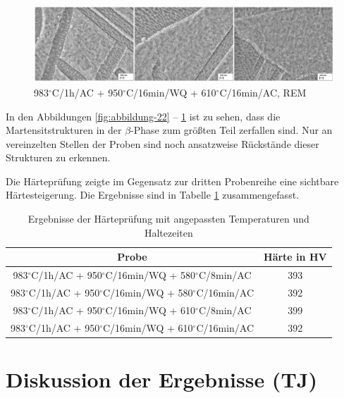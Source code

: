 \begin{figure}
	\centering
	\includegraphics[width=1.0\linewidth]{./Bilder/Abbildung 25.png}
	\caption[Abbildung 25]{983$^\circ$C/1h/AC + 950$^\circ$C/16min/WQ + 610$^\circ$C/16min/AC, REM}
	\label{fig:abbildung-25}
\end{figure}

In den Abbildungen \ref{fig:abbildung-22} -- \ref{fig:abbildung-25} ist zu sehen, dass die Martensitstrukturen in der $\beta$-Phase zum größten Teil zerfallen sind. Nur an vereinzelten Stellen der Proben sind noch ansatzweise Rückstände dieser Strukturen zu erkennen.

Die Härteprüfung zeigte im Gegensatz zur dritten Probenreihe eine sichtbare Härtesteigerung. Die Ergebnisse sind in Tabelle \ref{Tabelle 8} zusammengefasst.

\begin{table}
	\centering
	\begin{tabular}{|c|c|}
		\hline 
		Probe & Härte in HV \\ 
		\hline 
		983$^\circ$C/1h/AC + 950$^\circ$C/16min/WQ + 580$^\circ$C/8min/AC & 393 \\ 
		\hline 
		983$^\circ$C/1h/AC + 950$^\circ$C/16min/WQ + 580$^\circ$C/16min/AC & 392 \\ 
		\hline 
		983$^\circ$C/1h/AC + 950$^\circ$C/16min/WQ + 610$^\circ$C/8min/AC & 399 \\ 
		\hline 
		983$^\circ$C/1h/AC + 950$^\circ$C/16min/WQ + 610$^\circ$C/16min/AC & 392 \\ 
		\hline 
	\end{tabular} 
	\caption{Ergebnisse der Härteprüfung mit angepassten Temperaturen und Haltezeiten}
	\label{Tabelle 8}
\end{table}

\section{Diskussion der Ergebnisse (TJ)}

